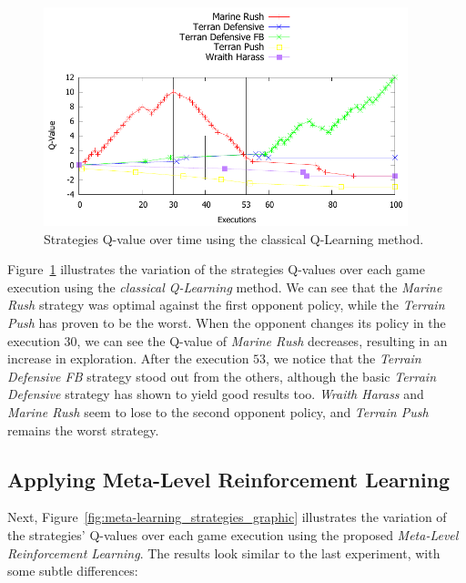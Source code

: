 \begin{figure}[ht]
\centering
\includegraphics[width=400px]{images/q-learning_strategies_graphic}
\caption{Strategies Q-value over time using the classical Q-Learning method.}
\label{fig:q-learning_strategies_graphic}
\end{figure}

Figure~\ref{fig:q-learning_strategies_graphic} illustrates the variation of the strategies Q-values over each game execution using the \textit{classical Q-Learning} method.
We can see that the \textit{Marine Rush} strategy was optimal against the first opponent policy, 
while the \textit{Terrain Push} has proven to be the worst.
When the opponent changes its policy in the execution $30$, we can see the Q-value of \textit{Marine Rush} decreases,
resulting in an increase in exploration. 
After the execution $53$, we notice that the \textit{Terrain Defensive FB} strategy stood out from the others, although the basic \textit{Terrain Defensive} strategy has shown to yield good results too. 
\textit{Wraith Harass} and \textit{Marine Rush} seem to lose to the second opponent policy, 
and \textit{Terrain Push} remains the worst strategy. 



\subsection{Applying Meta-Level Reinforcement Learning}
\label{subsec:applying_mlrl}

Next, Figure~\ref{fig:meta-learning_strategies_graphic} illustrates the variation of the strategies' Q-values over each game execution using the proposed \textit{Meta-Level Reinforcement Learning}.
The results look similar to the last experiment, with some subtle differences: 


